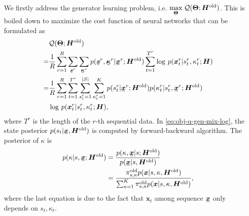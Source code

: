 \documentclass{ecai}
\newcommand{\ubar}[1]{\mkern2mu\underline{\mkern-2mu #1\mkern-2mu}\mkern2mu}
\newcommand{\ubm}[1]{\ubar{\bm{#1}}}
\newcommand{\ubmr}[2]{\ubar{\bm{#1}}^{#2}}
\newcommand{\bmtr}[3]{\bm{#1}^{#3}_{#2}}
\newcommand{\smtr}[3]{{#1}^{#3}_{#2}}
\begin{document}
We firstly address the generator learning problem, i.e. $\underset{\bm{\Theta}}{\max}\; \mathcal{Q}(\bm{\Theta}; \bm{H}^{\mathrm{old}})$. This is boiled down to maximize the cost function of neural networks that can be formulated as
\begin{align}\label{eq:obj-q-gen-mix-log}
  &\Qq(\bm{\Theta}; \bm{H}^{\mathrm{old}}) \nonumber \\
  = &\frac{1}{R}\sum_{r=1}^{R}\sum_{\ubmr{s}{r}}\sum_{\ubmr{\kappa}{r}}{p(\ubmr{s}{r}, \ubmr{\kappa}{r}| \ubmr{x}{r}; \bm{H}^{\mathrm{old}})} \sum_{t=1}^{{T}^{r}}\log\,p(\bmtr{x}{t}{r} | \smtr{s}{t}{r}, \smtr{\kappa}{t}{r}; \bm{H}) \nonumber \\
  =& \frac{1}{R}\sum_{r=1}^{R} \sum_{t=1}^{{T}^{r}} \sum_{\smtr{s}{t}{r}=1}^{|\Ss|}  \sum_{\smtr{\kappa}{t}{r}=1}^{K}p(\smtr{s}{t}{r}| \ubmr{x}{r}; \bm{H}^{\mathrm{old}})p(\smtr{\kappa}{t}{r}|\smtr{s}{t}{r}, \ubmr{x}{r}; \bm{H}^{\mathrm{old}}) \nonumber\\
  &  \log\, p(\bmtr{x}{t}{r} | \smtr{s}{t}{r}, \smtr{\kappa}{t}{r}; \bm{H}), 
\end{align}
where $T^r$ is the length of the $r$-th sequential data. In \eqref{eq:obj-q-gen-mix-log}, the state posterior $p(s_t| \ubm{x}, \bm{H}^{\mathrm{old}})$ is computed by forward-backward algorithm. The posterior of $\kappa$ is
\begin{align}\label{eq:kappa-posterior}
  p(\kappa| s, \ubm{x}; \bm{H}^{\mathrm{old}})
  &=  \frac{p(\kappa, \ubm{x}| s; \bm{H}^{\mathrm{old}})}{p(\ubm{x}| s,\bm{H}^{\mathrm{old}})} \nonumber \\
  & = \frac{\pi_{s, \kappa}^{\mathrm{old}} p(\bm{x}| s, \kappa, \bm{H}^{\mathrm{old}})}{\sum_{\kappa=1}^{K}  \pi_{s, \kappa}^{\mathrm{old}} p(\bm{x}| s, \kappa,\bm{H}^{\mathrm{old}})},
\end{align}
where the last equation is due to the fact that $\bm{x}_t$ among sequence $\ubm{x}$ only depends on $s_t, \kappa_t$. 
\end{document}
